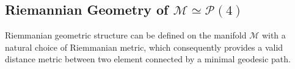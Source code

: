 \documentclass[letterpaper, 10 pt, conference]{ieeeconf}  %
\begin{document}
\subsection{Riemannian Geometry of $\mathcal{M} \simeq \mathcal{P}(4)$ }
Riemmanian geometric structure can be defined on the manifold $\mathcal{M}$ with a natural choice of Riemmanian metric, which consequently provides a valid distance metric between two element connected by a minimal geodesic path.
\end{document}

